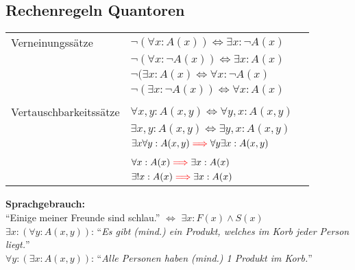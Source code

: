 \documentclass[8pt,landscape]{scrartcl}
\begin{document}
\begin{multicols}{3}
\subsection{Rechenregeln Quantoren}
\begin{tabular}{lll}
Verneinungss\"atze     & $\lnot (\forall x : A(x)) \iff \exists x : \lnot A(x) $ & \\
                       & $\lnot (\forall x : \lnot A(x)) \iff \exists x : A(x) $ & \\
                       & $\lnot (\exists x : A(x) \iff \forall x : \lnot A(x) $ & \\
                       & $\lnot (\exists x : \lnot A(x)) \iff \forall x : A(x) $ & \\
& & \\
Vertauschbarkeitss\"atze & $ \forall x, y : A(x, y) \iff \forall y, x : A(x, y) $ & \\
                         & $ \exists x, y : A(x, y) \iff \exists y, x : A(x, y) $ & \\
                         & $ \exists x \forall y : A(x, y) \textcolor{red}{\implies} \forall y \exists x : A(x, y) $ & \\\\
                         & $ \forall x : A(x) \textcolor{red}{\implies} \exists x : A(x) $ & \\
                         & $ \exists ! x : A(x) \textcolor{red}{\implies} \exists x : A(x) $ & \\
\end{tabular}
\textbf{Sprachgebrauch:}\\
``Einige meiner Freunde sind schlau.'' $\iff$ $\exists x : F(x) \land S(x) $\\
$\exists x : (\forall y : A(x, y))$: ``\textit{Es gibt (mind.) ein Produkt, welches im Korb jeder Person liegt.}''\\
$\forall y : (\exists x : A(x, y))$: ``\textit{Alle Personen haben (mind.) 1 Produkt im Korb.}''




\end{multicols}
\end{document}
